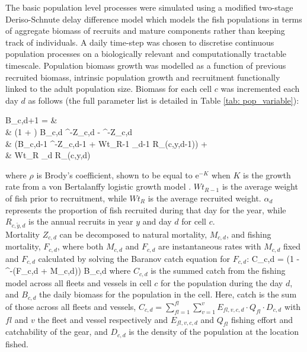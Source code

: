 \documentclass[review]{elsarticle}
\let\oldequation\equation
\let\oldendequation\endequation
\renewenvironment{equation}
 {\linenomathNonumbers\oldequation}
 {\oldendequation\endlinenomath}
\begin{document}
The basic population level processes were simulated using a modified two-stage
Deriso-Schnute delay difference model which models the fish populations in
terms of aggregate biomass of recruits and mature components rather than
keeping track of individuals\citep{Deriso1980, Schnute1985, Dichmont2003}. A
daily time-step was chosen to discretise continuous population processes on a
biologically relevant and computationally tractable timescale. Population
biomass growth was modelled as a function of previous recruited biomass,
intrinsic population growth and recruitment functionally linked to the adult
population size.  Biomass for each cell $c$ was incremented each day $d$ as
follows (the full parameter list is detailed in Table \ref{tab: pop_variable}): 
\begin{equation}
	\begin{split}
	B_{c,d+1} = &\\
	& (1 + \rho) B_{c,d} \cdot {}^{-Z_{c,d}} - \rho \cdot
	^{-Z_{c,d}} \hspace{2.9cm}
	\times \\  
	& (B_{c,d-1} \cdot {}^{-Z_{c,d-1}} + Wt_{R-1} \cdot \alpha_{d-1} \cdot
	R_{(c,y,d-1)})
	\hspace{0.4cm} + \\
	& Wt_{R} \cdot \alpha_{d} \cdot R_{(c,y,d)} 
	\end{split}
\end{equation}
where $\rho$ is Brody's coefficient, shown to be equal to $\mathrm{e}^{-K}$
when $K$ is the growth rate from a von Bertalanffy logistic growth model
\citep{Schnute1985}. $Wt_{R-1}$ is the average weight of fish prior to
recruitment, while $Wt_{R}$ is the average recruited weight. $\alpha_{d}$
represents the proportion of fish recruited during that day for the year, while
$R_{c,\tilde{y},d}$ is the annual recruits in year $y$ and day $d$ for cell
$c$. \\

Mortality $Z_{c,d}$ can be decomposed to natural mortality, $M_{c,d}$, and
fishing mortality, $F_{c,d}$, where both $M_{c,d}$ and $F_{c,d}$ are
instantaneous rates with $M_{c,d}$ fixed and $F_{c,d}$ calculated by solving
the Baranov catch equation \citep{Hilborn1992b} for $F_{c,d}$:
\begin{equation}
C_{c,d} =  \cdot \left(1 -
	^{-(F_{c,d} + M_{c,d})}\right) \cdot B_{c,d}
\end{equation}
where $C_{c,d}$ is the summed catch from the fishing model across all fleets
and vessels in cell $c$ for the population during the day $d$, and $B_{c,d}$
the daily biomass for the population in the cell. Here, catch is the sum of
those across all fleets and vessels, $C_{c, d} =
\sum\limits_{fl=1}^{fl}\sum\limits_{v=1}^{v} E_{fl, v, c, d} \cdot Q_{fl} \cdot
D_{c, d}$ with $fl$ and $v$ the fleet and vessel respectively and
$E_{fl,v,c,d}$ and $Q_{fl}$ fishing effort and catchability of the gear, and
$D_{c,d}$ is the density of the population at the location fished. \\
\end{document}
